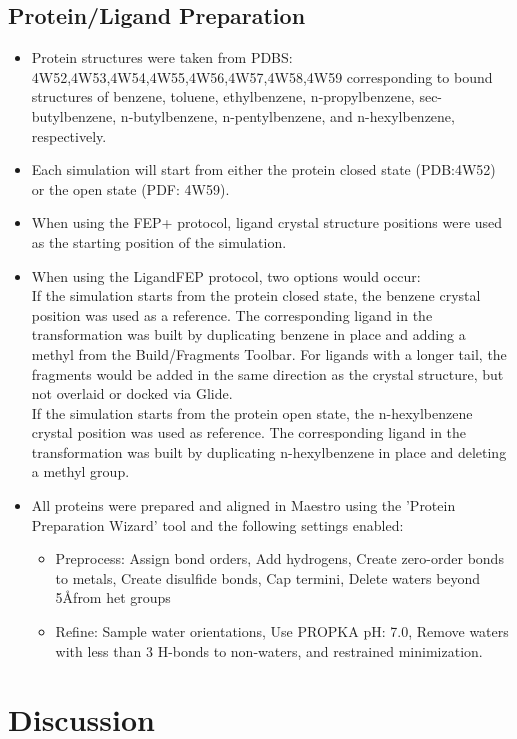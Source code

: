 \documentclass{article}
\begin{document}
\subsection{Protein/Ligand Preparation}
   \begin{itemize}
   \item Protein structures were taken from PDBS: 4W52,4W53,4W54,4W55,4W56,4W57,4W58,4W59 corresponding to bound structures of benzene, toluene, ethylbenzene, n-propylbenzene, sec-butylbenzene, n-butylbenzene, n-pentylbenzene, and n-hexylbenzene, respectively.
   \item Each simulation will start from either the protein closed state (PDB:4W52) or the open state (PDF: 4W59).
   \item When using the FEP+ protocol, ligand crystal structure positions were used as the starting position of the simulation.
   \item When using the LigandFEP protocol, two options would occur:
      \\If the simulation starts from the protein closed state, the benzene crystal position was used as a reference. The corresponding ligand in the transformation was built by duplicating benzene in place and adding a methyl from the Build/Fragments Toolbar. For ligands with a longer tail, the fragments would be added in the same direction as the crystal structure, but not overlaid or docked via Glide.
      \\If the simulation starts from the protein open state, the n-hexylbenzene crystal position was used as reference. The corresponding ligand in the transformation was built by duplicating n-hexylbenzene in place and deleting a methyl group.
   \item All proteins were prepared and aligned in Maestro using the 'Protein Preparation Wizard' tool and the following settings enabled:
   \begin{itemize}
      \item Preprocess: Assign bond orders, Add hydrogens, Create zero-order bonds to metals, Create disulfide bonds, Cap termini, Delete waters beyond 5\AA from het groups
      \item Refine: Sample water orientations, Use PROPKA pH: 7.0, Remove waters with less than 3 H-bonds to non-waters, and restrained minimization.
   \end{itemize}
   \end{itemize}
   
\section{Discussion}
\end{document}
